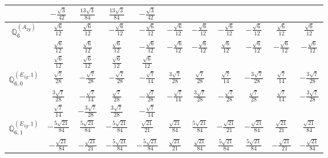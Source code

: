 \documentclass[fleqn,10pt,landscape]{article}
\begin{document}
\begin{itemize}
{\begin{center}
\begin{longtable}{ccccccccccc}
& $ - \frac{\sqrt{3}}{42} $ & $ \frac{13 \sqrt{3}}{84} $ & $ \frac{13 \sqrt{3}}{84} $ & $ - \frac{\sqrt{3}}{42} $ & $  $ & $  $ & $  $ & $  $ & $  $ & $  $ \\ \hline
$\mathbb{Q}_{6}^{(A_{2g})}$ & $ \frac{\sqrt{6}}{12} $ & $ \frac{\sqrt{6}}{12} $ & $ - \frac{\sqrt{6}}{12} $ & $ - \frac{\sqrt{6}}{12} $ & $ - \frac{\sqrt{6}}{12} $ & $ - \frac{\sqrt{6}}{12} $ & $ - \frac{\sqrt{6}}{12} $ & $ - \frac{\sqrt{6}}{12} $ & $ \frac{\sqrt{6}}{12} $ & $ \frac{\sqrt{6}}{12} $ \\
& $ \frac{\sqrt{6}}{12} $ & $ \frac{\sqrt{6}}{12} $ & $ \frac{\sqrt{6}}{12} $ & $ - \frac{\sqrt{6}}{12} $ & $ - \frac{\sqrt{6}}{12} $ & $ - \frac{\sqrt{6}}{12} $ & $ \frac{\sqrt{6}}{12} $ & $ - \frac{\sqrt{6}}{12} $ & $ - \frac{\sqrt{6}}{12} $ & $ - \frac{\sqrt{6}}{12} $ \\
& $ \frac{\sqrt{6}}{12} $ & $ \frac{\sqrt{6}}{12} $ & $ \frac{\sqrt{6}}{12} $ & $ \frac{\sqrt{6}}{12} $ & $  $ & $  $ & $  $ & $  $ & $  $ & $  $ \\ \hline
$\mathbb{Q}_{6,0}^{(E_{1g},1)}$ & $ \frac{\sqrt{7}}{28} $ & $ - \frac{\sqrt{7}}{28} $ & $ - \frac{\sqrt{7}}{28} $ & $ - \frac{\sqrt{7}}{14} $ & $ \frac{3 \sqrt{7}}{28} $ & $ \frac{\sqrt{7}}{28} $ & $ \frac{\sqrt{7}}{14} $ & $ - \frac{3 \sqrt{7}}{28} $ & $ \frac{\sqrt{7}}{14} $ & $ - \frac{3 \sqrt{7}}{28} $ \\
& $ \frac{3 \sqrt{7}}{28} $ & $ - \frac{\sqrt{7}}{14} $ & $ \frac{\sqrt{7}}{28} $ & $ - \frac{\sqrt{7}}{28} $ & $ - \frac{\sqrt{7}}{14} $ & $ \frac{3 \sqrt{7}}{28} $ & $ - \frac{\sqrt{7}}{28} $ & $ \frac{\sqrt{7}}{28} $ & $ \frac{\sqrt{7}}{14} $ & $ - \frac{3 \sqrt{7}}{28} $ \\
& $ \frac{\sqrt{7}}{14} $ & $ - \frac{3 \sqrt{7}}{28} $ & $ \frac{3 \sqrt{7}}{28} $ & $ - \frac{\sqrt{7}}{14} $ & $  $ & $  $ & $  $ & $  $ & $  $ & $  $ \\ \hline
$\mathbb{Q}_{6,1}^{(E_{1g},1)}$ & $ - \frac{5 \sqrt{21}}{84} $ & $ \frac{5 \sqrt{21}}{84} $ & $ - \frac{5 \sqrt{21}}{84} $ & $ \frac{\sqrt{21}}{21} $ & $ \frac{\sqrt{21}}{84} $ & $ \frac{5 \sqrt{21}}{84} $ & $ - \frac{\sqrt{21}}{21} $ & $ - \frac{\sqrt{21}}{84} $ & $ \frac{\sqrt{21}}{21} $ & $ \frac{\sqrt{21}}{84} $ \\
& $ - \frac{\sqrt{21}}{84} $ & $ - \frac{\sqrt{21}}{21} $ & $ - \frac{5 \sqrt{21}}{84} $ & $ - \frac{5 \sqrt{21}}{84} $ & $ \frac{\sqrt{21}}{21} $ & $ \frac{\sqrt{21}}{84} $ & $ \frac{5 \sqrt{21}}{84} $ & $ \frac{5 \sqrt{21}}{84} $ & $ - \frac{\sqrt{21}}{21} $ & $ - \frac{\sqrt{21}}{84} $ \\

\end{longtable}
\end{center}}
\end{itemize}
\end{document}
